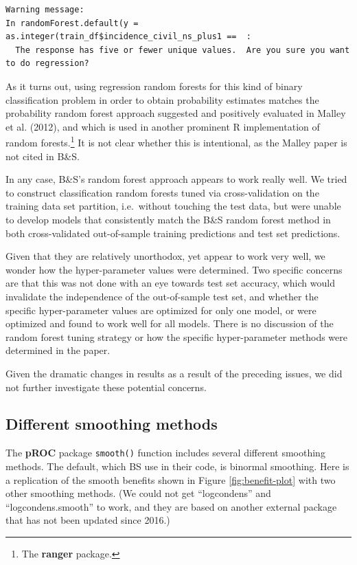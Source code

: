 \documentclass[
]{article}
\begin{document}
\begin{verbatim}
Warning message:
In randomForest.default(y = as.integer(train_df$incidence_civil_ns_plus1 ==  :
  The response has five or fewer unique values.  Are you sure you want to do regression?
\end{verbatim}

As it turns out, using regression random forests for this kind of binary classification problem in order to obtain probability estimates matches the probability random forest approach suggested and positively evaluated in Malley et al. (2012), and which is used in another prominent R implementation of random forests.\footnote{The \textbf{ranger} package.} It is not clear whether this is intentional, as the Malley paper is not cited in B\&S.

In any case, B\&S's random forest approach appears to work really well. We tried to construct classification random forests tuned via cross-validation on the training data set partition, i.e.~without touching the test data, but were unable to develop models that consistently match the B\&S random forest method in both cross-validated out-of-sample training predictions and test set predictions.

Given that they are relatively unorthodox, yet appear to work very well, we wonder how the hyper-parameter values were determined. Two specific concerns are that this was not done with an eye towards test set accuracy, which would invalidate the independence of the out-of-sample test set, and whether the specific hyper-parameter values are optimized for only one model, or were optimized and found to work well for all models. There is no discussion of the random forest tuning strategy or how the specific hyper-parameter methods were determined in the paper.

Given the dramatic changes in results as a result of the preceding issues, we did not further investigate these potential concerns.

\newpage

\hypertarget{different-smoothing-methods}{%
\subsection{Different smoothing methods}\label{different-smoothing-methods}}

The \textbf{pROC} package \texttt{smooth()} function includes several different smoothing methods. The default, which BS use in their code, is binormal smoothing. Here is a replication of the smooth benefits shown in Figure \ref{fig:benefit-plot} with two other smoothing methods. (We could not get ``logcondens'' and ``logcondens.smooth'' to work, and they are based on another external package that has not been updated since 2016.)
\end{document}
